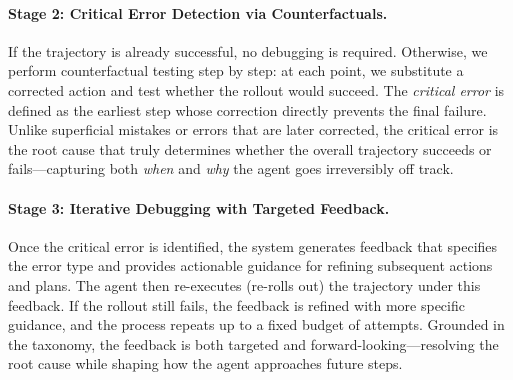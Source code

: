 \paragraph{Stage 2: Critical Error Detection via Counterfactuals.}  
If the trajectory is already successful, no debugging is required.  
Otherwise, we perform counterfactual testing step by step: at each point, we substitute a corrected action and test whether the rollout would succeed.  
The \emph{critical error} is defined as the earliest step whose correction directly prevents the final failure.  
Unlike superficial mistakes or errors that are later corrected, the critical error is the root cause that truly determines whether the overall trajectory succeeds or fails—capturing both \emph{when} and \emph{why} the agent goes irreversibly off track.  

\paragraph{Stage 3: Iterative Debugging with Targeted Feedback.}  
Once the critical error is identified, the system generates feedback that specifies the error type and provides actionable guidance for refining subsequent actions and plans.  
The agent then re-executes (re-rolls out) the trajectory under this feedback. If the rollout still fails, the feedback is refined with more specific guidance, and the process repeats up to a fixed budget of attempts.  
Grounded in the \AET{} taxonomy, the feedback is both targeted and forward-looking—resolving the root cause while shaping how the agent approaches future steps.  



